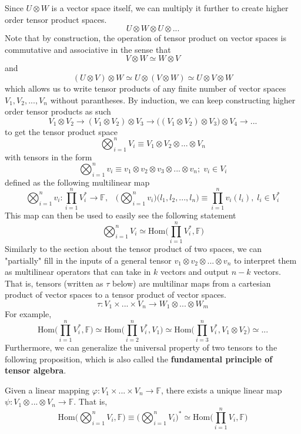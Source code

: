   Since $U \otimes W$ is a vector space itself, we can multiply it further to create higher order tensor product spaces. 
  \[U \otimes W \otimes U \otimes ...\]
  Note that by construction, the operation of tensor product on vector spaces is commutative and associative in the sense that 
  \[V \otimes W \simeq W \otimes V\]
  and 
  \[(U \otimes V) \otimes W \simeq U \otimes (V \otimes W) \simeq U \otimes V \otimes W \]
  which allows us to write tensor products of any finite number of vector spaces $V_1, V_2, ..., V_n$ without parantheses. By induction, we can keep constructing higher order tensor products as such 
  \[V_1 \otimes V_2 \rightarrow (V_1 \otimes V_2) \otimes V_3 \rightarrow \big((V_1 \otimes V_2) \otimes V_3 \big) \otimes V_4 \rightarrow ...\]
  to get the tensor product space
  \[\bigotimes_{i=1}^{n} V_{i} \equiv V_1 \otimes V_2 \otimes ... \otimes V_n\]
  with tensors in the form 
  \[ \bigotimes_{i=1}^{n} v_{i} \equiv v_{1} \otimes v_{2} \otimes v_{3} \otimes ... \otimes v_{n}; \; v_{i} \in V_{i}\]
  defined as the following multilinear map 
  \[ \bigotimes_{i=1}^{n} v_{i}: \prod_{i=1}^{n} V_{i}^{*} \longrightarrow \mathbb{F}, \;\;\; \bigg( \bigotimes_{i=1}^{n} v_{i} \bigg) \big( l_{1}, l_{2}, ..., l_{n} \big) \equiv \prod_{i=1}^{n} v_{i}(l_{i}), \; l_i \in V_i^* \]
  This map can then be used to easily see the following statement
  \[\bigotimes_{i=1}^n V_i \simeq \text{Hom}\Big( \prod_{i=1}^n V_i^*, \mathbb{F} \Big)\]
  Similarly to the section about the tensor product of two spaces, we can "partially" fill in the inputs of a general tensor $v_1 \otimes v_2 \otimes ... \otimes v_n$ to interpret them as multilinear operators that can take in $k$ vectors and output $n-k$ vectors. That is, tensors (written as $\tau$ below) are multilinar maps from a cartesian product of vector spaces to a tensor product of vector spaces. 
  \[\tau: V_1 \times ... \times V_n \longrightarrow W_1 \otimes ... \otimes W_m \]
  For example, 
  \[\text{Hom}\Big( \prod_{i=1}^n V_i^*, \mathbb{F} \Big) \simeq 
  \text{Hom}\Big( \prod_{i=2}^n V_i^*, V_1 \Big) \simeq 
  \text{Hom}\Big( \prod_{i=3}^n V_i^*, V_1 \otimes V_2 \Big) \simeq ... \]
  Furthermore, we can generalize the universal property of two tensors to the following proposition, which is also called the \textbf{fundamental principle of tensor algebra}. 

  \begin{proposition}
  Given a linear mapping $\varphi: V_1 \times ... \times V_n \longrightarrow \mathbb{F}$, there exists a unique linear map $\psi: V_1 \otimes ... \otimes V_n \longrightarrow \mathbb{F}$. That is, 
  \[\text{Hom}\Big( \bigotimes_{i=1}^n V_i, \mathbb{F} \Big) \equiv \bigg( \bigotimes_{i=1}^n V_i \bigg)^* \simeq \text{Hom}\Big(\prod_{i=1}^n V_i, \mathbb{F}\Big)\]
  \end{proposition}

